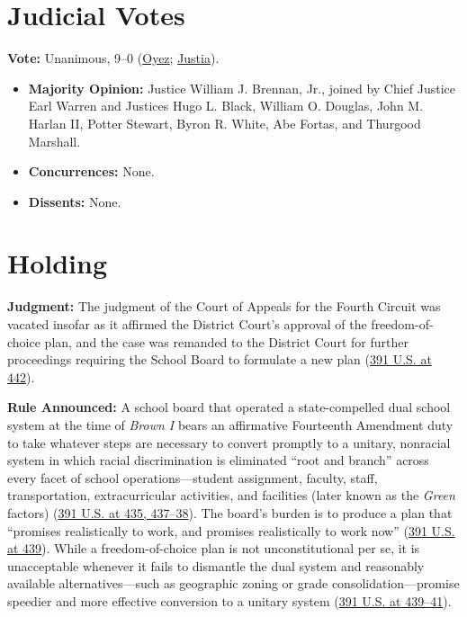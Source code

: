 \documentclass[12pt]{article}
\begin{document}
\section{Judicial Votes}

\textbf{Vote:} Unanimous, 9--0 (\href{https://www.oyez.org/cases/1967/695}{Oyez}; \href{https://supreme.justia.com/cases/federal/us/391/430/}{Justia}).

\begin{itemize}
\item \textbf{Majority Opinion:} Justice William J. Brennan, Jr., joined by Chief Justice Earl Warren and Justices Hugo L. Black, William O. Douglas, John M. Harlan II, Potter Stewart, Byron R. White, Abe Fortas, and Thurgood Marshall.
\item \textbf{Concurrences:} None.
\item \textbf{Dissents:} None.
\end{itemize}

\section{Holding}

\textbf{Judgment:} The judgment of the Court of Appeals for the Fourth Circuit was vacated insofar as it affirmed the District Court's approval of the freedom-of-choice plan, and the case was remanded to the District Court for further proceedings requiring the School Board to formulate a new plan (\href{https://supreme.justia.com/cases/federal/us/391/430/}{391 U.S. at 442}).

\textbf{Rule Announced:} A school board that operated a state-compelled dual school system at the time of \textit{Brown I} bears an affirmative Fourteenth Amendment duty to take whatever steps are necessary to convert promptly to a unitary, nonracial system in which racial discrimination is eliminated ``root and branch'' across every facet of school operations---student assignment, faculty, staff, transportation, extracurricular activities, and facilities (later known as the \textit{Green} factors) (\href{https://supreme.justia.com/cases/federal/us/391/430/}{391 U.S. at 435, 437--38}). The board's burden is to produce a plan that ``promises realistically to work, and promises realistically to work now'' (\href{https://supreme.justia.com/cases/federal/us/391/430/}{391 U.S. at 439}). While a freedom-of-choice plan is not unconstitutional per se, it is unacceptable whenever it fails to dismantle the dual system and reasonably available alternatives---such as geographic zoning or grade consolidation---promise speedier and more effective conversion to a unitary system (\href{https://supreme.justia.com/cases/federal/us/391/430/}{391 U.S. at 439--41}).
\end{document}
